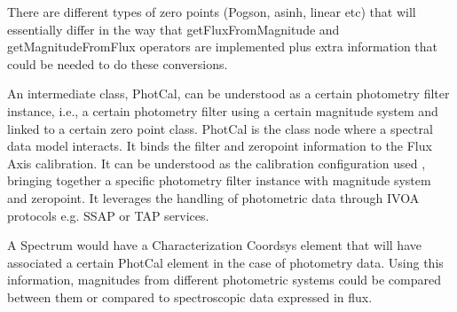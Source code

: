 \documentclass[11pt,a4paper]{ivoa}
\begin{document}
There are different types of zero points (Pogson, asinh, linear etc) that will 
essentially differ in the way that getFluxFromMagnitude and getMagnitudeFromFlux 
operators are implemented plus extra information that could be needed to do 
these conversions.
\par

An intermediate class, PhotCal, can be understood as a certain photometry 
filter instance, i.e., a certain photometry filter using a certain magnitude 
system and linked to a certain zero point class. 
PhotCal is the class node where a spectral data model interacts. 
It binds the filter and 
zeropoint information to the Flux Axis calibration. It can be understood as the 
calibration configuration used , bringing together a specific photometry filter 
instance with magnitude system and zeropoint. It leverages the handling of 
photometric data through IVOA protocols e.g. SSAP or TAP services.
\par

A Spectrum would have a Characterization Coordsys element that will have 
associated a certain PhotCal element in the case of photometry data. Using 
this information, magnitudes from different photometric systems could be 
compared between them or compared to spectroscopic data expressed in flux.
\par
\end{document}
